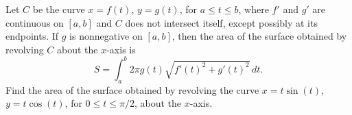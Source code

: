 \documentclass[../mathNotesPreamble]{subfiles}
\begin{document}
  \begin{ex*}
    Let $C$ be the curve $x=f(t)$, $y=g(t)$, for $a\leq t\leq b$, where $f'$ and $g'$ are continuous on $[a,b]$ and $C$ does not intersect itself, except possibly at its endpoints. If $g$ is nonnegative on $[a,b]$, then the area of the surface obtained by revolving $C$ about the $x$-axis is
      \[S=\int_a^b 2\pi g(t)\sqrt{f'(t)^2+g'(t)^2}\,dt.\]
    Find the area of the surface obtained by revolving the curve $x=t\sin(t)$, $y=t\cos(t)$, for $0\leq t\leq \pi/2$, about the $x$-axis.
  \end{ex*}
  \pagebreak
\end{document}
